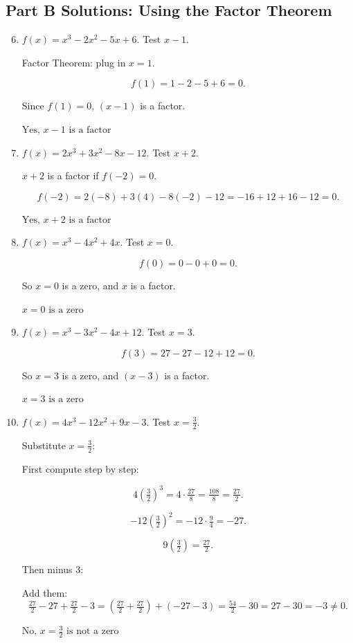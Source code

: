 \documentclass[14pt]{extarticle}
\begin{document}
\subsection*{Part B Solutions: Using the Factor Theorem}
\begin{enumerate}
  \setcounter{enumi}{5}
  \item \(f(x) = x^3 - 2x^2 - 5x + 6\). Test \(x - 1\).

  Factor Theorem: plug in \(x = 1.\)

  \[
  f(1) = 1 - 2 - 5 + 6 = 0.
  \]

  Since \(f(1) = 0\), \((x - 1)\) is a factor.

  \(\boxed{\text{Yes, } x - 1 \text{ is a factor}}\)

  \item \(f(x) = 2x^3 + 3x^2 - 8x - 12\). Test \(x + 2\).

  \(x + 2\) is a factor if \(f(-2) = 0.\)

  \[
  f(-2) = 2(-8) + 3(4) - 8(-2) - 12 = -16 + 12 + 16 - 12 = 0.
  \]

  \(\boxed{\text{Yes, } x + 2 \text{ is a factor}}\)

  \item \(f(x) = x^3 - 4x^2 + 4x\). Test \(x = 0\).

  \[
  f(0) = 0 - 0 + 0 = 0.
  \]

  So \(x = 0\) is a zero, and \(x\) is a factor.

  \(\boxed{x = 0 \text{ is a zero}}\)

  \item \(f(x) = x^3 - 3x^2 - 4x + 12\). Test \(x = 3\).

  \[
  f(3) = 27 - 27 - 12 + 12 = 0.
  \]

  So \(x = 3\) is a zero, and \((x - 3)\) is a factor.

  \(\boxed{x = 3 \text{ is a zero}}\)

  \item \(f(x) = 4x^3 - 12x^2 + 9x - 3\). Test \(x = \tfrac{3}{2}\).

  Substitute \(x = \tfrac{3}{2}\):

  First compute step by step:

  \[
  4\left(\tfrac{3}{2}\right)^3
  = 4 \cdot \tfrac{27}{8}
  = \tfrac{108}{8}
  = \tfrac{27}{2}.
  \]

  \[
  -12\left(\tfrac{3}{2}\right)^2
  = -12 \cdot \tfrac{9}{4}
  = -27.
  \]

  \[
  9\left(\tfrac{3}{2}\right)
  = \tfrac{27}{2}.
  \]

  Then minus 3:

  Add them:
  \[
  \tfrac{27}{2} - 27 + \tfrac{27}{2} - 3
  = \left(\tfrac{27}{2} + \tfrac{27}{2}\right) + (-27 - 3)
  = \tfrac{54}{2} - 30
  = 27 - 30
  = -3 \ne 0.
  \]

  \(\boxed{\text{No, } x = \tfrac{3}{2} \text{ is not a zero}}\)
\end{enumerate}
\end{document}
